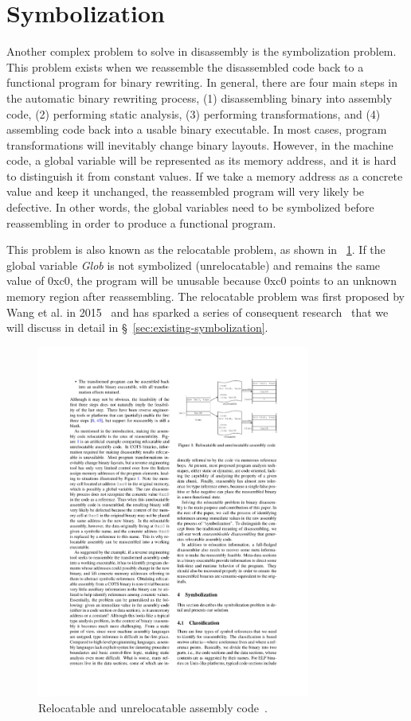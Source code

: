 \section{Symbolization} \label{sec:challenges-symbol}
Another complex problem to solve in disassembly is the symbolization problem.
This problem exists when we reassemble the disassembled code back to a
functional program for binary rewriting. In general, there are four main steps
in the automatic binary rewriting process, (1) disassembling binary into
assembly code, (2) performing static analysis, (3) performing transformations,
and (4) assembling code back into a usable binary executable.
In most cases, program transformations will inevitably change binary layouts.
However, in the machine code, a global variable will be represented as its
memory address, and it is hard to distinguish it from constant values. If we
take a memory address as a concrete value and keep it unchanged, the
reassembled program will very likely be defective. In other words, the global
variables need to be symbolized before reassembling in order to produce a
functional program.

This problem is also known as the relocatable problem, as shown in
\F~\ref{fig:relocatable}. If the global variable \textit{Glob} is not
symbolized (unrelocatable) and remains the same value of 0xc0, the program will
be unusable because 0xc0 points to an unknown memory region after reassembling.
The relocatable problem was first proposed by Wang et al. in
2015~\cite{wang2015reassembleable} and has sparked a series of consequent
research~\cite{wang2017ramblr,williams2020egalito,dinesh2020retrowrite} that we
will discuss in detail in \S~\ref{sec:existing-symbolization}.

\begin{figure}[tb]
  \centering
  \includegraphics[width=0.8\textwidth]{fig/relocatable.pdf}
  \caption{Relocatable and unrelocatable assembly code~\cite{wang2015reassembleable}.}
  \label{fig:relocatable}
\end{figure}

